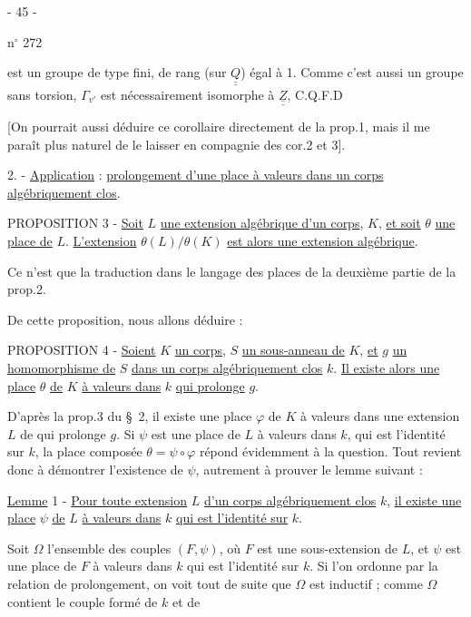 \begin{center}- 45 -\end{center}
\hfill n$^\circ$ 272

est un groupe de type fini, de rang (sur $\underline{\underline Q}$) égal à 1. Comme c'est aussi un groupe sans torsion, $\Gamma_{v'}$ est nécessairement isomorphe à $\underline{\underline Z}$, C.Q.F.D

[On pourrait aussi déduire ce corollaire directement de la prop.1, mais il me paraît plus naturel de le laisser en compagnie des cor.2 et 3].

2. - \uline{Application} : \uline{prolongement d'une place à valeurs dans un corps algébriquement clos}.

PROPOSITION 3 - \uline{Soit} $L$ \uline{une extension algébrique d'un corps}, $K$, \uline{et soit} $\theta$ \uline{une place de} $L$. \uline{L'extension} $\theta(L)/\theta(K)$ \uline{est alors une extension algébrique}.

Ce n'est que la traduction dans le langage des places de la deuxième partie de la prop.2.

De cette proposition, nous allons déduire :

PROPOSITION 4 - \uline{Soient} $K$ \uline{un corps}, $S$ \uline{un sous-anneau de} $K$, \uline{et} $g$ \uline{un homomorphisme de} $S$ \uline{dans un corps algébriquement clos} $k$. \uline{Il existe alors une place} $\theta$ \uline{de} $K$ \uline{à valeurs dans} $k$ \uline{qui prolonge} $g$.

D'après la prop.3 du \S\ 2, il existe une place $\varphi$ de $K$ à valeurs dans une extension $L$ de  qui prolonge $g$. Si $\psi$ est une place de $L$ à valeurs dans $k$, qui est l'identité sur $k$, la place composée $\theta=\psi\circ\varphi$ répond évidemment à la question. Tout revient donc à démontrer l'existence de $\psi$, autrement  à prouver le lemme suivant :

\uline{Lemme} 1 - \uline{Pour toute extension} $L$ \uline{d'un corps algébriquement clos} $k$, \uline{il existe une place} $\psi$ \uline{de} $L$ \uline{à valeurs dans} $k$ \uline{qui est l'identité sur} $k$.

Soit $\Omega$ l'ensemble des couples $(F,\psi)$, où $F$ est une sous-extension de $L$, et $\psi$ est une place de $F$ à valeurs dans $k$ qui est l'identité sur $k$. Si l'on ordonne \inserted{$\Omega$} par la relation de prolongement, on voit tout de suite que $\Omega$ est inductif ; comme $\Omega$ contient le couple formé de $k$ et de
